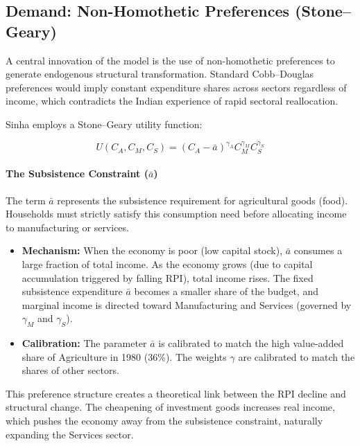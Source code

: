 \documentclass[12pt]{article}
\begin{document}
\subsection{Demand: Non-Homothetic Preferences (Stone--Geary)}
A central innovation of the model is the use of non-homothetic preferences to generate endogenous structural transformation. Standard Cobb--Douglas preferences would imply constant expenditure shares across sectors regardless of income, which contradicts the Indian experience of rapid sectoral reallocation.

Sinha employs a Stone--Geary utility function:

\[
U(C_A, C_M, C_S) = (C_A - \bar{a})^{\gamma_A} C_M^{\gamma_M} C_S^{\gamma_S}
\]

\paragraph{The Subsistence Constraint ($\bar{a}$)}
The term $\bar{a}$ represents the subsistence requirement for agricultural goods (food). Households must strictly satisfy this consumption need before allocating income to manufacturing or services.

\begin{itemize}[leftmargin=*,itemsep=4pt]
\item \textbf{Mechanism:} When the economy is poor (low capital stock), $\bar{a}$ consumes a large fraction of total income. As the economy grows (due to capital accumulation triggered by falling RPI), total income rises. The fixed subsistence expenditure $\bar{a}$ becomes a smaller share of the budget, and marginal income is directed toward Manufacturing and Services (governed by $\gamma_M$ and $\gamma_S$).
\item \textbf{Calibration:} The parameter $\bar{a}$ is calibrated to match the high value-added share of Agriculture in 1980 (36\%). The weights $\gamma$ are calibrated to match the shares of other sectors.
\end{itemize}

This preference structure creates a theoretical link between the RPI decline and structural change. The cheapening of investment goods increases real income, which pushes the economy away from the subsistence constraint, naturally expanding the Services sector.
\end{document}
